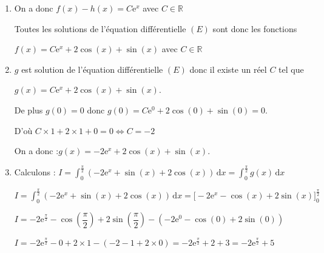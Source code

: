 \documentclass[10pt]{article}
\providecommand{\R}{\mathbb{R}}
\providecommand{\e}{{\mathrm{e}}}
\begin{document}
\begin{enumerate}
D'où : $f'(x) = f(x) -h(x) +h'(x) = f(x) -h(x) + h(x) -\cos (x)-3 \sin (x)$ car $h$ est solution de $(E)$

Donc : $f'(x) =  f(x) -\cos (x)-3 \sin (x)$ c'est à dire $f$ est solution de $(E)$.

\emph{Conclusion :} $f$ est solution de $(E)$ si et seulement si $f-h$ est solution de $(E_0)$.
		\item

On a donc $f(x)-h(x)= C\e^x$ avec $C \in \R$

Toutes les solutions de l'équation différentielle $(E)$ sont donc les fonctions

$f(x)=C\e^x +2\cos(x)+\sin(x)$ avec $C \in \R$

\item $g$ est solution de l'équation différentielle $(E)$  donc il existe un réel $C$ tel que

$g(x)=C\e^x +2\cos(x)+\sin(x)$.

De plus  $g(0)=0$ donc $g(0)=C\e^0 +2\cos(0)+\sin(0)=0$.

D'où $C\times 1 +2\times 1 + 0 =0 \Longleftrightarrow C=-2$

On a donc :\quad $g(x)=-2\e^x +2\cos(x)+\sin(x)$.

		\item
Calculons : \quad$\displaystyle
I = \int_{0}^{\frac{\pi}{2}}\left(-2 \e^{x}+\sin (x)+2 \cos (x)\right)\,  \mathrm{d} x = \int_{0}^{\frac{\pi}{2}} g(x)\,  \mathrm{d} x $


$\displaystyle
I = 	\int_{0}^{\frac{\pi}{2}}\left(-2 \e^{x}+\sin (x)+2 \cos (x)\right)\,  \mathrm{d} x = \Big[ -2\e^{x} -\cos(x) +2\sin(x) \Big]_0^ {\frac{\pi}{2}}$

$I= -2\e^{\frac{\pi}{2}} -\cos\left(  {\dfrac{\pi}{2}}\right) +2\sin\left(  {\dfrac{\pi}{2}}\right)  - \left(  -2\e^{0} -\cos(0) +2\sin(0)  \right) $

$I= -2\e^{\frac{\pi}{2}} -0+2\times 1 - \left( -2 -1+2\times 0\right) =  -2\e^{\frac{\pi}{2}}+ 2 +3  = -2\e^{\frac{\pi}{2}}+ 5  $

		\end{enumerate}

\medskip
\end{document}
